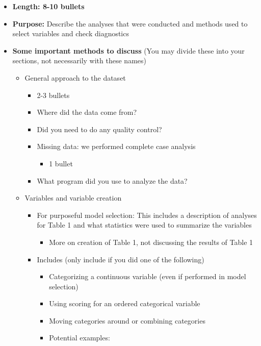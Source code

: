 \documentclass[
  letterpaper,
  DIV=11,
  numbers=noendperiod]{scrartcl}
\providecommand{\tightlist}{%
  \setlength{\itemsep}{0pt}\setlength{\parskip}{0pt}}
\begin{document}
\begin{itemize}
\tightlist
\item
  \textbf{Length: 8-10 bullets}
\item
  \textbf{Purpose:} Describe the analyses that were conducted and
  methods used to select variables and check diagnostics
\item
  \textbf{Some important methods to discuss} (You may divide these into
  your sections, not necessarily with these names)

  \begin{itemize}
  \tightlist
  \item
    General approach to the dataset

    \begin{itemize}
    \tightlist
    \item
      2-3 bullets
    \item
      Where did the data come from?
    \item
      Did you need to do any quality control?
    \item
      Missing data: we performed complete case analysis

      \begin{itemize}
      \tightlist
      \item
        1 bullet
      \end{itemize}
    \item
      What program did you use to analyze the data?
    \end{itemize}
  \item
    Variables and variable creation

    \begin{itemize}
    \tightlist
    \item
      {For purposeful model selection}: This includes a description of
      analyses for Table 1 and what statistics were used to summarize
      the variables

      \begin{itemize}
      \tightlist
      \item
        More on creation of Table 1, not discussing the results of Table
        1
      \end{itemize}
    \item
      Includes (only include if you did one of the following)

      \begin{itemize}
      \tightlist
      \item
        Categorizing a continuous variable (even if performed in model
        selection)
      \item
        Using scoring for an ordered categorical variable
      \item
        Moving categories around or combining categories
      \item
        Potential examples:


\end{itemize}
\end{itemize}
\end{itemize}
\end{itemize}
\end{document}
